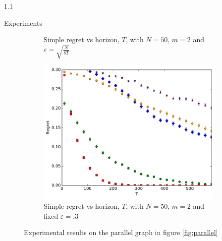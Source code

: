 \documentclass[12pt]{beamer}
\newlength{\onecolwid}
\let\epsilon\varepsilon
\begin{document}
\begin{frame}[t]
\begin{columns}[t]
\begin{column}{1.1\onecolwid}
\begin{block}{Experiments}
\begin{figure}
\begin{subfigure}[t]{0.3\textwidth}
    		\caption{Simple regret vs horizon, $T$, with $N = 50$, $m=2$ and $\epsilon = \sqrt{\frac{N}{8T}}$}
        \label{fig:simple_vs_T_vary_epsilon}
    \end{subfigure}\hfill
    \begin{subfigure}[t]{0.3\textwidth}
    		\centering
    		\includegraphics[width=\textwidth]{experiment3_20161020_1252.pdf}
    		\caption{Simple regret vs horizon, $T$, with $N = 50$, $m=2$ and fixed $\epsilon = .3$}
    		\label{fig:simple_vs_T}
    \end{subfigure}
    \caption{Experimental results on the parallel graph in figure \ref{fig:parallel}}
    \label{fig:experiments}
\end{figure}




\end{block}
\end{column}
\end{columns}
\end{frame}
\end{document}
